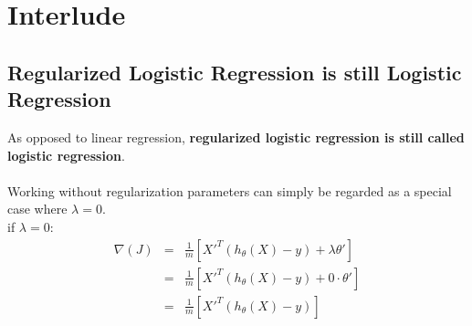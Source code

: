 
\section*{Interlude}
\subsection*{Regularized Logistic Regression is still Logistic Regression}
As opposed to linear regression, \textbf{regularized logistic regression is still 
called logistic regression}.\\
\\
Working without regularization parameters can simply be regarded as a special 
case where $\lambda = 0$.\\

if $\lambda = 0$:
\begin{eqnarray*}
    \nabla(J)   & = & \frac{1}{m} [X'^T(h_\theta(X) - y) + \lambda \theta'] \\
                & = & \frac{1}{m} [X'^T(h_\theta(X) - y) + 0 \cdot \theta'] \\
                & = & \frac{1}{m} [X'^T(h_\theta(X) - y)]    
\end{eqnarray*}